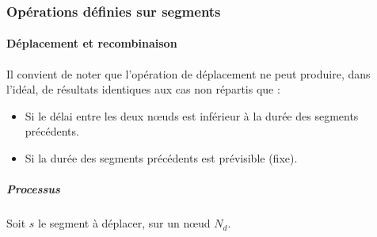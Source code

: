 \subsubsection{Opérations définies sur segments}
\paragraph{Déplacement et recombinaison}

Il convient de noter que l'opération de déplacement ne peut produire, dans l'idéal, de résultats identiques aux cas non répartis que : 
\begin{itemize}
\item Si le délai entre les deux nœuds est inférieur à la durée des segments précédents.
\item Si la durée des segments précédents est prévisible (fixe).
\end{itemize} 

\subparagraph{Processus}
Soit $s$ le segment à déplacer, sur un nœud $N_d$.

